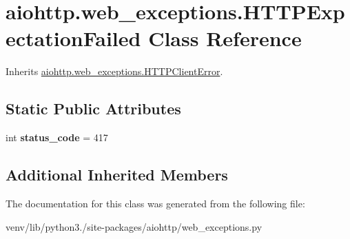 \hypertarget{classaiohttp_1_1web__exceptions_1_1_h_t_t_p_expectation_failed}{}\section{aiohttp.\+web\+\_\+exceptions.\+H\+T\+T\+P\+Expectation\+Failed Class Reference}
\label{classaiohttp_1_1web__exceptions_1_1_h_t_t_p_expectation_failed}


Inherits \hyperlink{classaiohttp_1_1web__exceptions_1_1_h_t_t_p_client_error}{aiohttp.\+web\+\_\+exceptions.\+H\+T\+T\+P\+Client\+Error}.

\subsection*{Static Public Attributes}
\begin{DoxyCompactItemize}
\item 
\mbox{\label{classaiohttp_1_1web__exceptions_1_1_h_t_t_p_expectation_failed_ad7b846b4a6d8fed396732922954dd0e3}} 
int {\bfseries status\+\_\+code} = 417
\end{DoxyCompactItemize}
\subsection*{Additional Inherited Members}


The documentation for this class was generated from the following file\+:\begin{DoxyCompactItemize}
\item 
venv/lib/python3./site-\/packages/aiohttp/web\+\_\+exceptions.\+py\end{DoxyCompactItemize}
